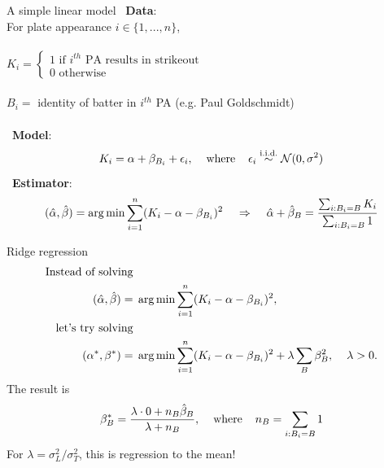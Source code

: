 \documentclass{beamer}
\def\l{\left}\def\r{\right}\def\lf{\lfloor}\def\rf{\rfloor}
\def\iid{\stackrel{\mbox{\scriptsize i.i.d.}}{\sim}}
\begin{document}
\begin{frame}{A simple linear model}
~{\bf Data}:\\
For plate appearance $i \in \{1, ..., n\}$,\\~\\
$K_i = \l\{\begin{array}{l}1\mbox{ if $i^{th}$ PA results in strikeout}\\
    0\mbox{ otherwise}\end{array}\r.$\\~\\
$B_i =$ identity of batter in $i^{th}$ PA (e.g. Paul Goldschmidt)\\~\\
~{\bf Model}:
$$K_i = \alpha + \beta_{B_i} + \epsilon_i, \hspace{4mm}
    \mbox{where}\hspace{4mm} \epsilon_i \iid \N(0,\sigma^2)$$
~{\bf Estimator}:
$$(\hat\alpha, \hat\beta) = \arg\min\sum_{i=1}^n(K_i - \alpha - \beta_{B_i})^2
    \hspace{4mm} \Rightarrow \hspace{4mm}
    \hat\alpha + \hat\beta_{B} = \frac{\sum_{i:B_i=B}K_i}{\sum_{i:B_i=B}1}$$
\end{frame}

\begin{frame}{Ridge regression}
\vspace{-1cm}
\begin{align*}
\mbox{Instead of solving}&\\   (\hat\alpha, \hat\beta) = & \hspace{1mm}
    \arg\min\sum_{i=1}^n(K_i - \alpha - \beta_{B_i})^2,\\
\mbox{let's try solving}&\\    (\alpha^*, \beta^*) = & \hspace{1mm}
    \arg\min\sum_{i=1}^n(K_i-\alpha-\beta_{B_i})^2 + \lambda\sum_B\beta_B^2,
    \hspace{4mm}\lambda > 0.
\end{align*}
The result is
$$\beta^*_B = \frac{\lambda\cdot0 + n_B\hat\beta_B}{\lambda + n_B},\hspace{4mm}
    \mbox{where}\hspace{4mm}n_B = \sum_{i:B_i=B}1$$
For $\lambda = \sigma^2_L/\sigma^2_T$, this is regression to the mean!
\end{frame}
\end{document}
